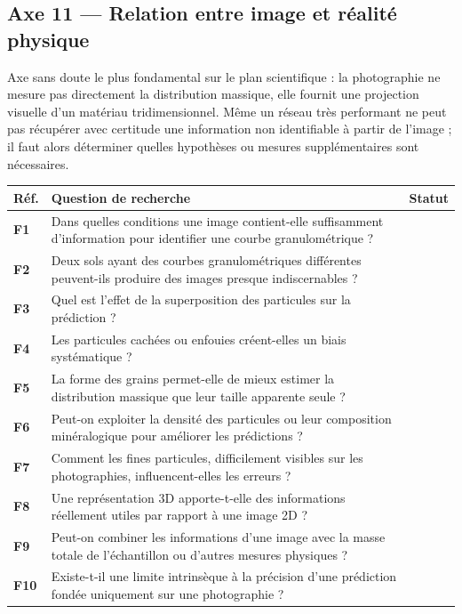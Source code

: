 \documentclass[11pt,a4paper]{article}
\makeatletter
\newenvironment{qtable}{%
  \par\smallskip
  \begin{longtable}{@{}>{\bfseries}p{1.0cm} p{12.3cm} p{1.5cm}@{}}
  \toprule
  \textbf{Réf.} & \textbf{Question de recherche} & \textbf{Statut}\\
  \midrule
  \endhead
}{%
  \bottomrule
  \end{longtable}
}
\makeatother
\begin{document}
\subsection*{Axe 11 --- Relation entre image et réalité physique}
Axe sans doute le plus fondamental sur le plan scientifique : la photographie ne mesure pas directement la distribution massique, elle fournit une projection visuelle d'un matériau tridimensionnel. Même un réseau très performant ne peut pas récupérer avec certitude une information non identifiable à partir de l'image ; il faut alors déterminer quelles hypothèses ou mesures supplémentaires sont nécessaires.
\begin{qtable}
F1 & Dans quelles conditions une image contient-elle suffisamment d'information pour identifier une courbe granulométrique ? & \\
F2 & Deux sols ayant des courbes granulométriques différentes peuvent-ils produire des images presque indiscernables ? & \\
F3 & Quel est l'effet de la superposition des particules sur la prédiction ? & \\
F4 & Les particules cachées ou enfouies créent-elles un biais systématique ? & \\
F5 & La forme des grains permet-elle de mieux estimer la distribution massique que leur taille apparente seule ? & \\
F6 & Peut-on exploiter la densité des particules ou leur composition minéralogique pour améliorer les prédictions ? & \\
F7 & Comment les fines particules, difficilement visibles sur les photographies, influencent-elles les erreurs ? & \\
F8 & Une représentation 3D apporte-t-elle des informations réellement utiles par rapport à une image 2D ? & \\
F9 & Peut-on combiner les informations d'une image avec la masse totale de l'échantillon ou d'autres mesures physiques ? & \\
F10 & Existe-t-il une limite intrinsèque à la précision d'une prédiction fondée uniquement sur une photographie ? & \\
\end{qtable}
\end{document}
